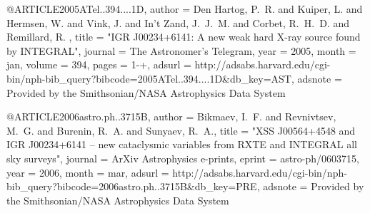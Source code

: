 


@ARTICLE{2005ATel..394....1D,
   author = {{Den Hartog}, P.~R. and {Kuiper}, L. and {Hermsen}, W. and {Vink}, J. and 
	{In't Zand}, J.~J.~M. and {Corbet}, R.~H.~D. and {Remillard}, R.
	},
    title = "{IGR J00234+6141: A new weak hard X-ray source found by INTEGRAL}",
  journal = {The Astronomer's Telegram},
     year = 2005,
    month = jan,
   volume = 394,
    pages = {1-+},
   adsurl = {http://adsabs.harvard.edu/cgi-bin/nph-bib_query?bibcode=2005ATel..394....1D&db_key=AST},
  adsnote = {Provided by the Smithsonian/NASA Astrophysics Data System}
}



@ARTICLE{2006astro.ph..3715B,
   author = {{Bikmaev}, I.~F. and {Revnivtsev}, M.~G. and {Burenin}, R.~A. and 
	{Sunyaev}, R.~A.},
    title = "{XSS J00564+4548 and IGR J00234+6141 -- new cataclysmic variables from RXTE and INTEGRAL all sky surveys}",
  journal = {ArXiv Astrophysics e-prints},
   eprint = {astro-ph/0603715},
     year = 2006,
    month = mar,
   adsurl = {http://adsabs.harvard.edu/cgi-bin/nph-bib_query?bibcode=2006astro.ph..3715B&db_key=PRE},
  adsnote = {Provided by the Smithsonian/NASA Astrophysics Data System}
}



